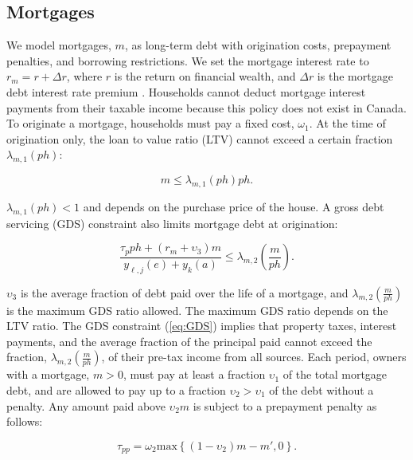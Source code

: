 \documentclass[parskip=full]{article}
\begin{document}
\subsection{Mortgages}\label{subsection:morgtages}

We model mortgages, $m$, as long-term debt with origination costs, prepayment penalties, and borrowing restrictions. We set the mortgage interest rate to $r_{m}=r+\Delta r$, where $r$ is the return on financial wealth, and $\Delta r$ is the mortgage debt interest rate premium \citep{sommeretal-2013,sommersullivan-2017,kaplanetal-2019}. Households cannot deduct mortgage interest payments from their taxable income because this policy does not exist in Canada. To originate a mortgage, households must pay a fixed cost, $\omega_{1}$. At the time of origination only, the loan to value ratio (LTV) cannot exceed a certain fraction $\lambda_{m,1}(ph)$:

\begin{equation}\label{eq:LTV}
m \leq \lambda_{m,1}(ph) p h.
\end{equation}

\noindent $\lambda_{m,1}(ph)<1$ and depends on the purchase price of the house. A gross debt servicing (GDS) constraint also limits mortgage debt at origination: 

\begin{equation}\label{eq:GDS}
\frac{\tau_{p}ph+(r_{m}+\upsilon_{3})m}{y_{\ell,j}(e)+y_{k}(a)} \leq \lambda_{m,2}\left(\frac{m}{ph}\right).
\end{equation}

\noindent $\upsilon_{3}$ is the average fraction of debt paid over the life of a mortgage, and $\lambda_{m,2}\left(\frac{m}{ph}\right)$ is the maximum GDS ratio allowed. The maximum GDS ratio depends on the LTV ratio. The GDS constraint (\ref{eq:GDS}) implies that property taxes, interest payments, and the average fraction of the principal paid cannot exceed the fraction, $\lambda_{m,2}\left(\frac{m}{ph}\right)$, of their pre-tax income from all sources. Each period, owners with a mortgage, $m>0$, must pay at least a fraction $\upsilon_{1}$ of the total mortgage debt, and are allowed to pay up to a fraction $\upsilon_{2}>\upsilon_{1}$ of the debt without a penalty. Any amount paid above $\upsilon_{2}m$ is subject to a prepayment penalty as follows: 

\begin{equation}\label{eq:prepayment_penalty}
\tau_{pp}=\omega_{2}\mbox{max}\left\{(1-\upsilon_{2})m-m',0\right\}.
\end{equation}
\end{document}
